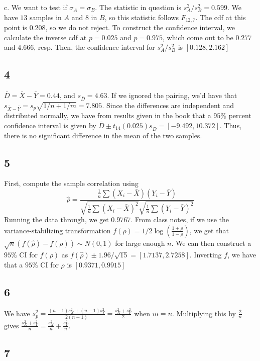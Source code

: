 \documentclass{article}
\begin{document}
\noindent c. We want to test if $\sigma_A=\sigma_B$. The statistic in question is $s_A^2/s_B^2=0.599$. We have $13$ samples in $A$ and $8$ in $B$, so this statistic follows $F_{12,7}$. The cdf at this point is $0.208$, so we do not reject. To construct the confidence interval, we calculate the inverse cdf at $p=0.025$ and $p=0.975$, which come out to be $0.277$ and $4.666$, resp. Then, the confidence interval for $s_A^2/s_B^2$ is $[0.128,2.162]$
\subsection*{4}
$\bar{D}=\bar{X}-\bar{Y}=0.44$, and $s_{\bar{D}}=4.63$. If we ignored the pairing, we'd have that $s_{\bar{X}-\bar{Y}}=s_p\sqrt{1/n+1/m}=7.805$. Since the differences are independent and distributed normally, we have from results given in the book that a $95\%$ percent confidence interval is given by $\bar{D}\pm t_{14}(0.025)s_{\bar{D}}=[-9.492,10.372]$. Thus, there is no significant difference in the mean of the two samples. 
\subsection*{5}
First, compute the sample correlation using 
$$\hat{\rho}=\frac{\frac{1}{n}\sum(X_i-\bar{X})(Y_i-\bar{Y})}{\sqrt{\frac{1}{n}\sum(X_i-\bar{X})^2}\sqrt{\frac{1}{n}\sum(Y_i-\bar{Y})^2}}$$
Running the data through, we get $0.9767$. From class notes, if we use the variance-stabilizing transformation $f(\rho)=1/2\log\left(\frac{1+\rho}{1-\rho}\right)$, we get that $\sqrt{n}(f(\hat{\rho})-f(\rho))\sim N(0,1)$ for large enough $n$. We can then construct a $95\%$ CI for $f(\rho)$ as $f(\hat{\rho})\pm1.96/\sqrt{15}=[1.7137,2.7258]$. Inverting $f$, we have that a $95\%$ CI for $\rho$ is $[0.9371,0.9915]$
\subsection*{6}
We have $s_p^2=\frac{(n-1)s_X^2+(n-1)s_Y^2}{2(n-1)}=\frac{s_X^2+s_Y^2}{2}$ when $m=n$. Multiplying this by $\frac{2}{n}$ gives $\frac{s_X^2+s_Y^2}{n}=\frac{s_X^2}{n}+\frac{s_Y^2}{n}$.
\subsection*{7}
\end{document}
